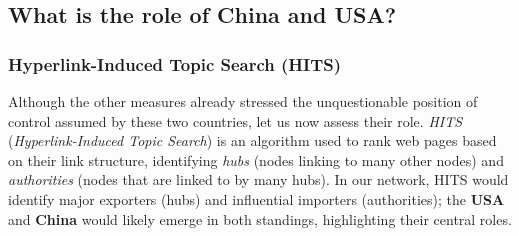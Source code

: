 \documentclass[12pt, a4paper]{article}
\begin{document}
\subsection{What is the role of China and USA?}
\subsubsection{Hyperlink-Induced Topic Search (HITS)}

Although the other measures already stressed the unquestionable position of control assumed by these two countries, let us now assess their role. \textit{HITS} (\textit{Hyperlink-Induced Topic Search}) is an algorithm used to rank web pages based on their link structure, identifying \textit{hubs} (nodes linking to many other nodes) and \textit{authorities} (nodes that are linked to by many hubs). In our network, HITS would identify major exporters (hubs) and influential importers (authorities); the \textbf{USA} and \textbf{China} would likely emerge in both standings, highlighting their central roles.
\end{document}
